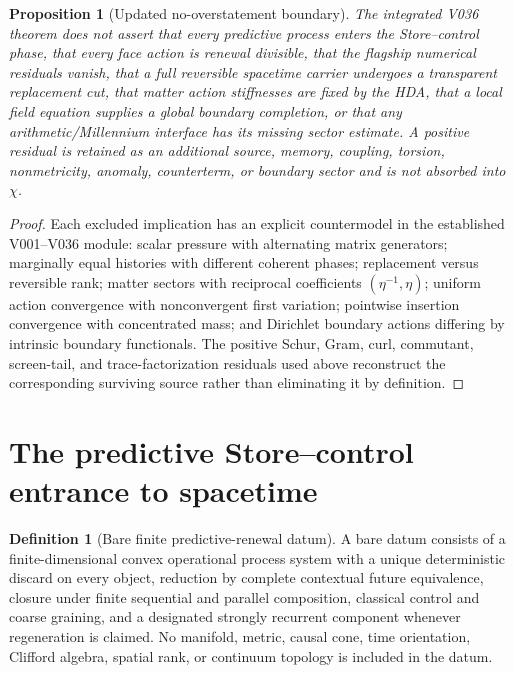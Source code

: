 \documentclass[11pt]{article}
\newtheorem{proposition}[theorem]{Proposition}
\theoremstyle{definition}
\newtheorem{definition}[theorem]{Definition}
\theoremstyle{remark}
\begin{document}
\begin{proposition}[Updated no-overstatement boundary]
\label{prop:master-V036-no-overstatement}
The integrated V036 theorem does not assert that every predictive process
enters the Store--control phase, that every face action is renewal divisible,
that the flagship numerical residuals vanish, that a full reversible
spacetime carrier undergoes a transparent replacement cut, that matter action
stiffnesses are fixed by the HDA, that a local field equation supplies a global
boundary completion, or that any arithmetic/Millennium interface has its
missing sector estimate.  A positive residual is retained as an additional
source, memory, coupling, torsion, nonmetricity, anomaly, counterterm, or
boundary sector and is not absorbed into \(\chi\).
\end{proposition}

\begin{proof}
Each excluded implication has an explicit countermodel in the established
V001--V036 module: scalar pressure with alternating matrix generators;
marginally equal histories with different coherent phases; replacement versus
reversible rank; matter sectors with reciprocal coefficients
\((\eta^{-1},\eta)\); uniform action convergence with nonconvergent first
variation; pointwise insertion convergence with concentrated mass; and
Dirichlet boundary actions differing by intrinsic boundary functionals.  The
positive Schur, Gram, curl, commutant, screen-tail, and trace-factorization
residuals used above reconstruct the corresponding surviving source rather
than eliminating it by definition.
\end{proof}

\section{The predictive Store--control entrance to spacetime}
\label{sec:predictive-store-control-entry}
\label{sec:predictive-clock-entry}
\label{sec:two-principle-entry}

\begin{definition}[Bare finite predictive-renewal datum]
\label{def:bare-renewal}
A bare datum consists of a finite-dimensional convex operational process
system with a unique deterministic discard on every object, reduction by
complete contextual future equivalence, closure under finite sequential and
parallel composition, classical control and coarse graining, and a designated
strongly recurrent component whenever regeneration is claimed.  No manifold,
metric, causal cone, time orientation, Clifford algebra, spatial rank, or
continuum topology is included in the datum.
\end{definition}
\end{document}
